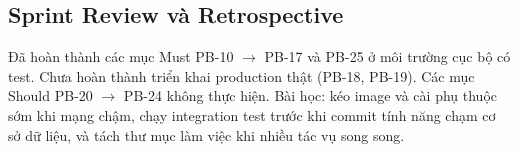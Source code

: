 \subsection{Sprint Review và Retrospective}

Đã hoàn thành các mục Must PB-10 $\rightarrow$ PB-17 và PB-25 ở môi trường cục bộ có test. Chưa hoàn thành triển khai production thật
(PB-18, PB-19). Các mục Should PB-20 $\rightarrow$ PB-24 không thực hiện. Bài học: kéo image và cài phụ thuộc sớm khi mạng chậm, chạy
integration test trước khi commit tính năng chạm cơ sở dữ liệu, và tách thư mục làm việc khi nhiều tác vụ song song.
